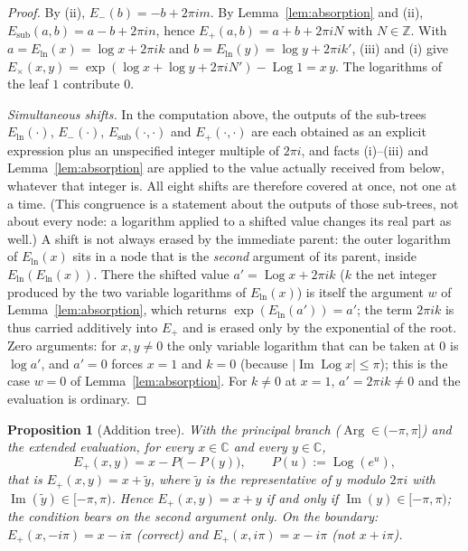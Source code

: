 \documentclass[11pt,a4paper]{article}
\newtheorem{proposition}[theorem]{Proposition}
\theoremstyle{definition}
\newcommand{\Log}{\operatorname{Log}}   %
\newcommand{\Arg}{\operatorname{Arg}}   %
\newcommand{\C}{\mathbb{C}}
\newcommand{\im}{\operatorname{Im}}
\begin{document}
\begin{proof}
By (ii), $E_{-}(b)=-b+2\pi i m$.  By Lemma~\ref{lem:absorption} and (ii),
$E_{\mathrm{sub}}(a,b)=a-b+2\pi i n$, hence $E_{+}(a,b)=a+b+2\pi i N$ with
$N\in\mathbb{Z}$.  With $a=E_{\ln}(x)=\log x+2\pi i k$ and
$b=E_{\ln}(y)=\log y+2\pi i k'$, (iii) and (i) give
$E_{\times}(x,y)=\exp(\log x+\log y+2\pi i N')-\Log 1=x\,y$.  The logarithms
of the leaf $1$ contribute $0$.

\emph{Simultaneous shifts.}  In the computation above, the outputs of the
sub-trees $E_{\ln}(\cdot)$, $E_{-}(\cdot)$, $E_{\mathrm{sub}}(\cdot,\cdot)$
and $E_{+}(\cdot,\cdot)$ are each obtained as an explicit expression plus an
unspecified integer multiple of $2\pi i$, and facts (i)--(iii) and
Lemma~\ref{lem:absorption} are applied to the value actually received from
below, whatever that integer is.  All eight shifts are therefore covered at
once, not one at a time.  (This congruence is a statement about the outputs
of those sub-trees, not about every node: a logarithm applied to a shifted
value changes its real part as well.)  A shift is not always erased by the immediate parent:
the outer logarithm of $E_{\ln}(x)$ sits in a node that is the \emph{second}
argument of its parent, inside $E_{\ln}(E_{\ln}(x))$.  There the shifted
value $a'=\Log x+2\pi i k$ ($k$ the net integer produced by the two
variable logarithms of $E_{\ln}(x)$) is itself the argument $w$ of
Lemma~\ref{lem:absorption}, which returns $\exp(E_{\ln}(a'))=a'$; the term
$2\pi i k$ is thus carried additively into $E_{+}$ and is erased only by the
exponential of the root.  Zero arguments: for $x,y\neq0$ the only variable
logarithm that can be taken at $0$ is $\log a'$, and $a'=0$ forces $x=1$ and
$k=0$ (because $|\im\Log x|\le\pi$); this is the case $w=0$ of
Lemma~\ref{lem:absorption}.  For $k\neq0$ at $x=1$, $a'=2\pi i k\neq0$ and
the evaluation is ordinary.
\end{proof}

\begin{proposition}[Addition tree]
\label{prop:add}
With the principal branch ($\Arg\in(-\pi,\pi]$) and the extended evaluation,
for every $x\in\C$ and every $y\in\C$,
\[
  E_{+}(x,y)=x-P\bigl(-P(y)\bigr),\qquad P(u):=\Log(e^{u}),
\]
that is $E_{+}(x,y)=x+\tilde y$, where $\tilde y$ is the representative of
$y$ modulo $2\pi i$ with $\im(\tilde y)\in[-\pi,\pi)$.  Hence
$E_{+}(x,y)=x+y$ if and only if $\im(y)\in[-\pi,\pi)$; the condition bears on
the second argument only.  On the boundary: $E_{+}(x,-i\pi)=x-i\pi$ (correct)
and $E_{+}(x,i\pi)=x-i\pi$ (not $x+i\pi$).
\end{proposition}
\end{document}
